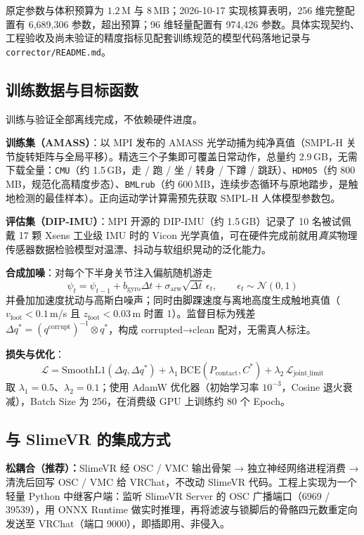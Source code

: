 \documentclass[scheme=plain,UTF8,11pt,a4paper]{ctexart}
\begin{document}
原定参数与体积预算为 $1.2$\,M 与 $8$\,MB；2026-10-17 实现核算表明，256 维完整配置有 6,689,306 参数，超出预算；96 维轻量配置有 974,426 参数。具体实现契约、工程验收及尚未验证的精度指标见配套训练规范的模型代码落地记录与 \texttt{corrector/README.md}。

\subsection{训练数据与目标函数}

训练与验证全部离线完成，不依赖硬件进度。

\textbf{训练集（AMASS）}：以 MPI 发布的 AMASS 光学动捕为纯净真值（SMPL-H 关节旋转矩阵与全局平移）。精选三个子集即可覆盖日常动作，总量约 2.9\,GB，无需下载全量：\texttt{CMU}（约 1.5\,GB，走 / 跑 / 坐 / 转身 / 下蹲 / 跳跃）、\texttt{HDM05}（约 800\,MB，规范化高精度步态）、\texttt{BMLrub}（约 600\,MB，连续步态循环与原地踏步，是触地检测的最佳样本）。正向运动学计算需预先获取 SMPL-H 人体模型参数包。

\textbf{评估集（DIP-IMU）}：MPI 开源的 DIP-IMU（约 1.5\,GB）记录了 10 名被试佩戴 17 颗 Xsens 工业级 IMU 时的 Vicon 光学真值，可在硬件完成前就用\emph{真实}物理传感器数据检验模型对温漂、抖动与软组织晃动的泛化能力。

\textbf{合成加噪}：对每个下半身关节注入偏航随机游走
\[
\psi_t = \psi_{t-1} + b_{\text{gyro}}\Delta t + \sigma_{\text{arw}}\sqrt{\Delta t}\,\epsilon_t,\qquad \epsilon_t \sim \mathcal{N}(0,1)
\]
并叠加加速度扰动与高斯白噪声；同时由脚踝速度与离地高度生成触地真值（$v_{\text{foot}} < 0.1$\,m/s 且 $z_{\text{foot}} < 0.03$\,m 时置 1）。监督目标为残差 $\Delta q^{*} = (q^{\text{corrupt}})^{-1} \otimes q^{*}$，构成 corrupted→clean 配对，无需真人标注。

\textbf{损失与优化}：
\[
\mathcal{L} = \text{SmoothL1}(\Delta q, \Delta q^{*}) + \lambda_1\,\text{BCE}(P_{\text{contact}}, C^{*}) + \lambda_2\,\mathcal{L}_{\text{joint\_limit}}
\]
取 $\lambda_1 = 0.5$、$\lambda_2 = 0.1$；使用 AdamW 优化器（初始学习率 $10^{-3}$，Cosine 退火衰减），Batch Size 为 256，在消费级 GPU 上训练约 80 个 Epoch。

\subsection{与 SlimeVR 的集成方式}

\textbf{松耦合（推荐）：}SlimeVR 经 OSC / VMC 输出骨架 → 独立神经网络进程消费 → 清洗后回写 OSC / VMC 给 VRChat，不改动 SlimeVR 代码。工程上实现为一个轻量 Python 中继客户端：监听 SlimeVR Server 的 OSC 广播端口（6969 / 39539），用 ONNX Runtime 做实时推理，再将滤波与锁脚后的骨骼四元数重定向发送至 VRChat（端口 9000），即插即用、非侵入。
\end{document}
